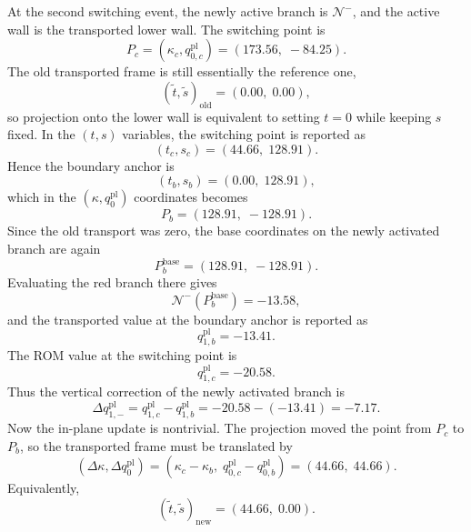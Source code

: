 \documentclass[11pt,a4paper]{article}
\begin{document}
At the second switching event, the newly active branch is \(\mathcal{N}^{-}\), and the active wall is the transported lower wall. The switching point is
\begin{equation}
P_c
=
(\kappa_c,q^{\mathrm{pl}}_{0,c})
=
(173.56,\;-84.25).
\end{equation}
The old transported frame is still essentially the reference one,
\begin{equation}
(\tilde t,\tilde s)_{\mathrm{old}}=(0.00,\;0.00),
\end{equation}
so projection onto the lower wall is equivalent to setting \(t=0\) while keeping \(s\) fixed. In the \((t,s)\) variables, the switching point is reported as
\begin{equation}
(t_c,s_c)=(44.66,\;128.91).
\end{equation}
Hence the boundary anchor is
\begin{equation}
(t_b,s_b)=(0.00,\;128.91),
\end{equation}
which in the \((\kappa,q^{\mathrm{pl}}_0)\) coordinates becomes
\begin{equation}
P_b=(128.91,\;-128.91).
\end{equation}
Since the old transport was zero, the base coordinates on the newly activated branch are again
\begin{equation}
P_b^{\mathrm{base}}=(128.91,\;-128.91).
\end{equation}
Evaluating the red branch there gives
\begin{equation}
\mathcal{N}^{-}(P_b^{\mathrm{base}})=-13.58,
\end{equation}
and the transported value at the boundary anchor is reported as
\begin{equation}
q^{\mathrm{pl}}_{1,b}=-13.41.
\end{equation}
The ROM value at the switching point is
\begin{equation}
q^{\mathrm{pl}}_{1,c}=-20.58.
\end{equation}
Thus the vertical correction of the newly activated branch is
\begin{equation}
\Delta q^{\mathrm{pl}}_{1,-}
=
q^{\mathrm{pl}}_{1,c}-q^{\mathrm{pl}}_{1,b}
=
-20.58-(-13.41)
=
-7.17.
\end{equation}
Now the in-plane update is nontrivial. The projection moved the point from \(P_c\) to \(P_b\), so the transported frame must be translated by
\begin{equation}
(\Delta \kappa,\Delta q^{\mathrm{pl}}_0)
=
(\kappa_c-\kappa_b,\;q^{\mathrm{pl}}_{0,c}-q^{\mathrm{pl}}_{0,b})
=
(44.66,\;44.66).
\end{equation}
Equivalently,
\begin{equation}
(\tilde t,\tilde s)_{\mathrm{new}}=(44.66,\;0.00).
\end{equation}
\end{document}
